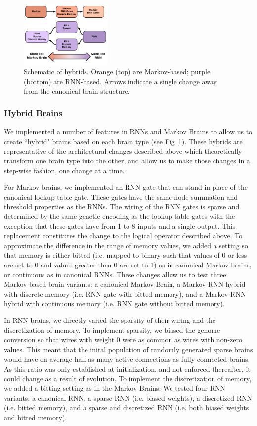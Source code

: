 \begin{figure}
    \centering
    \includegraphics[width=0.4\textwidth]{chapters/2-comp-hybrid/figs/Markov_vs_RNN_H.png}
    \caption{Schematic of hybrids. Orange (top) are Markov-based; purple (bottom) are RNN-based. Arrows indicate a single change away from the canonical brain structure.}
    \label{fig:hybrids}
\end{figure}

\subsubsection{Hybrid Brains}

We implemented a number of features in RNNs and Markov Brains to allow us to create ``hybrid" brains based on each brain type (see Fig~\ref{fig:hybrids}). 
These hybrids are representative of the architectural changes described above which theoretically transform one brain type into the other, and allow us to make those changes in a step-wise fashion, one change at a time.

For Markov brains, we implemented an RNN gate that can stand in place of the canonical lookup table gate. 
These gates have the same node summation and threshold properties as the RNNs. 
The wiring of the RNN gates is sparse and determined by the same genetic encoding as the lookup table gates with the exception that these gates have from 1 to 8 inputs and a single output. 
This replacement constitutes the change to the logical operator described above. 
To approximate the difference in the range of memory values, we added a setting so that memory is either bitted (i.e. mapped to binary such that values of 0 or less are set to 0 and values greater then 0 are set to 1) as in canonical Markov brains, or continuous as in canonical RNNs. 
These changes allow us to test three Markov-based brain variants: a canonical Markov Brain, a Markov-RNN hybrid with discrete memory (i.e. RNN gate with bitted memory), and a Markov-RNN hybrid with continuous memory (i.e. RNN gate without bitted memory). 

In RNN brains, we directly varied the sparsity of their wiring and the discretization of memory. 
To implement sparsity, we biased the genome conversion so that wires with weight 0 were as common as wires with non-zero values. 
This meant that the inital population of randomly generated sparse brains would have on average half as many active connections as fully connected brains. 
As this ratio was only established at initialization, and not enforced thereafter, it could change as a result of evolution. 
To implement the discretization of memory, we added a bitting setting as in the Markov Brains. 
We tested four RNN variants: a canonical RNN, a sparse RNN (i.e. biased weights), a discretized RNN (i.e. bitted memory), and a sparse and discretized RNN (i.e. both biased weights and bitted memory).

